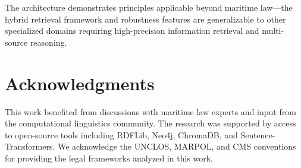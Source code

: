 \documentclass[11pt,a4paper]{article}
\begin{document}
The architecture demonstrates principles applicable beyond maritime law---the hybrid retrieval framework and robustness features are generalizable to other specialized domains requiring high-precision information retrieval and multi-source reasoning.

\section*{Acknowledgments}

This work benefited from discussions with maritime law experts and input from the computational linguistics community. The research was supported by access to open-source tools including RDFLib, Neo4j, ChromaDB, and Sentence-Transformers. We acknowledge the UNCLOS, MARPOL, and CMS conventions for providing the legal frameworks analyzed in this work.



\end{document}
